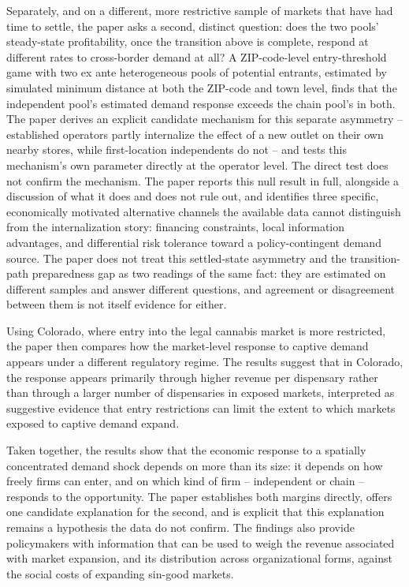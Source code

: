 \documentclass[english,12pt]{article}
\begin{document}
Separately, and on a different, more restrictive sample of markets that have had time to settle, the paper asks a second, distinct question: does the two pools' steady-state profitability, once the transition above is complete, respond at different rates to cross-border demand at all? A ZIP-code-level entry-threshold game with two ex ante heterogeneous pools of potential entrants, estimated by simulated minimum distance at both the ZIP-code and town level, finds that the independent pool's estimated demand response exceeds the chain pool's in both. The paper derives an explicit candidate mechanism for this separate asymmetry -- established operators partly internalize the effect of a new outlet on their own nearby stores, while first-location independents do not -- and tests this mechanism's own parameter directly at the operator level. The direct test does not confirm the mechanism. The paper reports this null result in full, alongside a discussion of what it does and does not rule out, and identifies three specific, economically motivated alternative channels the available data cannot distinguish from the internalization story: financing constraints, local information advantages, and differential risk tolerance toward a policy-contingent demand source. The paper does not treat this settled-state asymmetry and the transition-path preparedness gap as two readings of the same fact: they are estimated on different samples and answer different questions, and agreement or disagreement between them is not itself evidence for either.

Using Colorado, where entry into the legal cannabis market is more restricted, the paper then compares how the market-level response to captive demand appears under a different regulatory regime. The results suggest that in Colorado, the response appears primarily through higher revenue per dispensary rather than through a larger number of dispensaries in exposed markets, interpreted as suggestive evidence that entry restrictions can limit the extent to which markets exposed to captive demand expand.

Taken together, the results show that the economic response to a spatially concentrated demand shock depends on more than its size: it depends on how freely firms can enter, and on which kind of firm -- independent or chain -- responds to the opportunity. The paper establishes both margins directly, offers one candidate explanation for the second, and is explicit that this explanation remains a hypothesis the data do not confirm. The findings also provide policymakers with information that can be used to weigh the revenue associated with market expansion, and its distribution across organizational forms, against the social costs of expanding sin-good markets.
\end{document}
